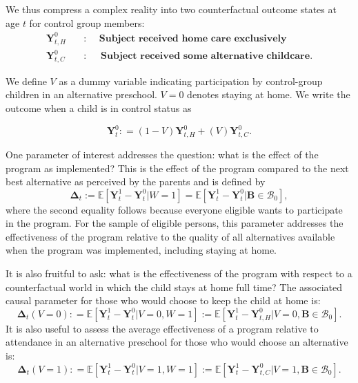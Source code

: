 We thus compress a complex reality into two counterfactual outcome states at age $t$ for control group members:
\begin{align*}
\bm{Y}_{t,H}^0 \quad &: \quad \textbf{ Subject received home care exclusively} \\
\bm{Y}_{t,C}^0 \quad &: \quad \textbf{ Subject received some alternative childcare}.
\end{align*}

We define $V$ as a dummy variable indicating participation by control-group children in an alternative preschool. $V=0$ denotes staying at home. We write the outcome when a child is in control status as 

\begin{equation}
\bm{Y}^0_t : = \left( 1 - V \right) \bm{Y}^0_{t,H} + \left( V \right) \bm{Y}^0_{t,C}. \label{eq:meandiff}
\end{equation}

One parameter of interest addresses the question: what is the effect of the program as implemented? This is the effect of the program compared to the next best alternative as perceived by the parents and is defined by
\begin{equation}\label{eq:effect}
\bm{\Delta}_t := \mathbb{E} \left[ \bm{Y}^1_t -  \bm{Y}^0_t | W =1 \right] = \mathbb{E} \left[\bm{Y}^1_t - \bm{Y}^0_t | \bm{B} \in \mathcal{B}_0 \right],
\end{equation}
where the second equality follows because everyone eligible wants to participate in the program. For the sample of eligible persons, this parameter addresses the effectiveness of the program relative to the quality of all alternatives available when the program was implemented, including staying at home.

It is also fruitful to ask: what is the effectiveness of the program with respect to a counterfactual world in which the child stays at home full time? The associated causal parameter for those who would choose to keep the child at home is:
\begin{equation}\label{eq:influenza}
\bm{\Delta}_t \left(V = 0 \right) : =   \mathbb{E} \left[ \bm{Y}^1_t - \bm{Y}^0_t | V = 0, W = 1 \right] := \mathbb{E} \left[\bm{Y}^1_{t} - \bm{Y}^0_{t,H} | V = 0, \bm{B} \in \mathcal{B}_0 \right].
\end{equation}
It is also useful to assess the average effectiveness of a program relative to attendance in an alternative preschool for those who would choose an alternative is:
\begin{equation}\label{eq:smallpox}
\bm{\Delta}_t \left( V =1 \right) : =   \mathbb{E} \left[ \bm{Y}^1_t - \bm{Y}^0_t | V = 1, W = 1 \right] := \mathbb{E} \left[\bm{Y}^1_t - \bm{Y}^0_{t,C} | V = 1, \bm{B} \in \mathcal{B}_0 \right].
\end{equation}

